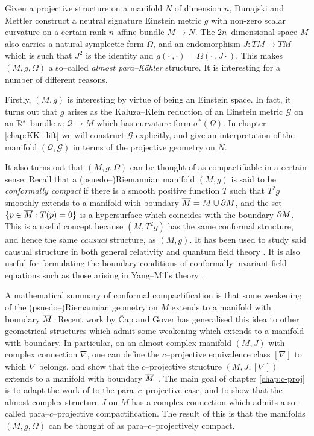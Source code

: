 Given a projective structure on a manifold $N$ of dimension $n$,
Dunajski and Mettler \cite{DM} construct a neutral signature Einstein metric $g$ with non-zero
scalar curvature on a certain rank $n$ affine bundle $M\rightarrow N$.
The $2n$--dimensional space $M$ also carries a natural symplectic form $\Omega$, and
an endomorphism $J:TM\rightarrow TM$ which is such that $J^2$ is the identity and $g(\cdot\ ,\cdot)=\Omega(\cdot\ ,J\cdot)$. This makes $(M,g,\Omega)$ a so--called \textit{almost para--K\"ahler} structure. It is interesting for a number of different reasons.

Firstly, $(M,g)$ is interesting by virtue of being an Einstein
space. In fact, it turns out that $g$ arises as the Kaluza--Klein reduction of an Einstein metric $\mathcal{G}$ on an $\mathbb{R}^*$ bundle $\sigma:\mathcal{Q}\rightarrow M$ which has curvature form $\sigma^*(\Omega)$. In chapter \ref{chap:KK_lift} we will construct $\mathcal{G}$ explicitly, and give an interpretation of the manifold $(\mathcal{Q},\mathcal{G})$ in terms of the projective geometry on $N$.

It also turns out that $(M,g,\Omega)$ can be thought of as compactifiable in a certain sense. Recall that a (psuedo--)Riemannian manifold $(M,g)$ is said to be \textit{conformally compact} if there is a smooth positive function $T$ such that $T^2g$ smoothly extends to a manifold with boundary $\overline{M}=M\cup\partial M$, and the set $\{p\in\overline{M}:T(p)=0\}$ is a hypersurface which coincides with the boundary $\partial M$.  This is a useful concept because $(M,T^2g)$ has the same conformal structure, and hence the same \textit{causual} structure, as $(M,g)$. It has been used to study said causual structure in both general relativity \cite{penrose65} and quantum field theory \cite{witten}. It is also useful for formulating the boundary conditions of conformally invariant field equations such as those arising in Yang--Mills theory \cite{uhlen}.

A mathematical summary of conformal compactification is that some weakening of the (psuedo--)Riemannian geometry on $M$ extends to a manifold with boundary $\overline{M}$. Recent work by \v Cap and Gover \cite{CG0,CG} has generalised this idea to other geometrical structures which admit some weakening which extends to a manifold with boundary. In particular, on an almost complex manifold $(M,J)$ with complex connection $\nabla$, one can define the $c$--projective equivalence class $[\nabla]$ to which $\nabla$ belongs, and show that the $c$--projective structure $(M,J,[\nabla])$ extends to a manifold with boundary $\overline{M}$ \cite{CG}. The main goal of chapter \ref{chap:c-proj} is to adapt the work of \cite{CG} to the para--$c$--projective case, and to show that the almost complex structure $J$ on $M$ has a complex connection which admits a so--called para--$c$--projective compactification. The result of this is that the manifolds $(M,g,\Omega)$ can be thought of as para--$c$--projectively compact.


